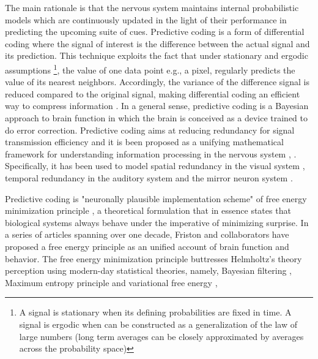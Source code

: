 \documentclass[11pt, onecolumn]{article}
\begin{document}
The main rationale is that the nervous system maintains internal probabilistic models which are continuously updated in the light of their performance in predicting the upcoming suite of cues. Predictive coding is a form of differential coding where the signal of interest is the difference between the actual signal and its prediction. This technique exploits the fact that under stationary and ergodic assumptions \footnote{A signal is stationary when its defining probabilities are fixed in time. A signal is ergodic when can be constructed as a generalization of the law of large numbers (long term averages can be closely approximated by averages across the probability space)}, the value of one data point e.g., a pixel, regularly predicts the value of its nearest neighbors. Accordingly, the variance of the difference signal is reduced compared to the original signal, making differential coding an efficient way to compress information \citep{shi_image_1999}.
In a general sense, predictive coding is a Bayesian approach to brain function in which the brain is conceived as a device trained to do error correction. Predictive coding aims at reducing redundancy for signal transmission efficiency and it is been proposed as a unifying mathematical framework for understanding information processing in the nervous system \citep{Friston:2010}, \citep{huang_predictive_2011}. Specifically, it has been used to model spatial redundancy in the visual system \citep{srinivasan_predictive_1982}, temporal redundancy in the auditory system \citep{baldeweg_repetition_2006} and the mirror neuron system \citep{kilner_predictive_2007}. 


Predictive coding is "neuronally plausible implementation scheme" of free energy minimization principle \citep{schwartenbeck_exploration_2013}, a theoretical formulation that in essence states that biological systems always behave under the imperative of minimizing surprise. In a series of articles spanning over one decade, Friston and collaborators have proposed a free energy principle as an unified account of brain function and behavior. The free energy minimization principle buttresses Helmholtz’s theory perception using modern-day statistical theories, namely, Bayesian filtering \citep{friston_theory_2005}, Maximum entropy principle \citep{Jaynes:2003} and variational free energy \citep{Hinton-Camp:1993},  
\end{document}
